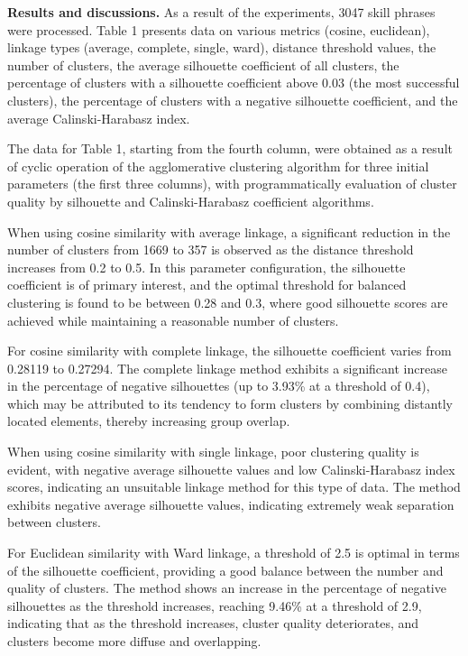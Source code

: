 \begin{multicols}{2}
{\bfseries Results and discussions.} As a result of the experiments, 3047
skill phrases were processed. Table 1 presents data on various metrics
(cosine, euclidean), linkage types (average, complete, single, ward),
distance threshold values, the number of clusters, the average
silhouette coefficient of all clusters, the percentage of clusters with
a silhouette coefficient above 0.03 (the most successful clusters), the
percentage of clusters with a negative silhouette coefficient, and the
average Calinski-Harabasz index.

The data for Table 1, starting from the fourth column, were obtained as
a result of cyclic operation of the agglomerative clustering algorithm
for three initial parameters (the first three columns), with
programmatically evaluation of cluster quality by silhouette and
Calinski-Harabasz coefficient algorithms.

When using cosine similarity with average linkage, a significant
reduction in the number of clusters from 1669 to 357 is observed as the
distance threshold increases from 0.2 to 0.5. In this parameter
configuration, the silhouette coefficient is of primary interest, and
the optimal threshold for balanced clustering is found to be between
0.28 and 0.3, where good silhouette scores are achieved while
maintaining a reasonable number of clusters.

For cosine similarity with complete linkage, the silhouette coefficient
varies from 0.28119 to 0.27294. The complete linkage method exhibits a
significant increase in the percentage of negative silhouettes (up to
3.93\% at a threshold of 0.4), which may be attributed to its tendency
to form clusters by combining distantly located elements, thereby
increasing group overlap.

When using cosine similarity with single linkage, poor clustering
quality is evident, with negative average silhouette values and low
Calinski-Harabasz index scores, indicating an unsuitable linkage method
for this type of data. The method exhibits negative average silhouette
values, indicating extremely weak separation between clusters.

For Euclidean similarity with Ward linkage, a threshold of 2.5 is
optimal in terms of the silhouette coefficient, providing a good balance
between the number and quality of clusters. The method shows an increase
in the percentage of negative silhouettes as the threshold increases,
reaching 9.46\% at a threshold of 2.9, indicating that as the threshold
increases, cluster quality deteriorates, and clusters become more
diffuse and overlapping.


\end{multicols}
